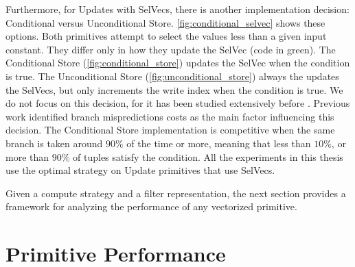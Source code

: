 \documentclass[12pt]{cmuthesis}
\begin{document}
Furthermore, for Updates with SelVecs, there is another implementation decision: Conditional versus Unconditional Store. \cref{fig:conditional_selvec} shows these options. Both primitives attempt to select the values less than a given input constant. They differ only in how they update the SelVec (code in green). The Conditional Store (\cref{fig:conditional_store}) updates the SelVec when the condition is true. The Unconditional Store (\cref{fig:unconditional_store}) always the updates the SelVecs, but only increments the write index when the condition is true. We do not focus on this decision, for it has been studied extensively before \cite{miro_adapt, sompolski_vec}. Previous work identified branch mispredictions costs as the main factor influencing this decision. The Conditional Store implementation is competitive when the same branch is taken around $90\%$ of the time or more, meaning that less than $10\%$, or more than $90\%$ of tuples satisfy the condition. All the experiments in this thesis use the optimal strategy on Update primitives that use SelVecs.

Given a compute strategy and a filter representation, the next section provides a framework for analyzing the performance of any vectorized primitive.

\section{Primitive Performance}
\label{prim_perf_section}
\end{document}
